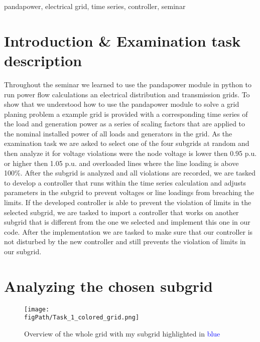 \documentclass[conference]{IEEEtran}
\newcommand{\figPath}{images}
\begin{document}
\begin{IEEEkeywords}
pandapower, electrical grid, time series, controller, seminar
\end{IEEEkeywords}

\section{Introduction \& Examination task description}
Throughout the seminar we learned to use the pandapower module in python to run power flow calculations an electrical distribution and transmission grids.\cite{pandapower.2018} To show that we understood how to use the pandapower module to solve a grid planing problem a example grid is provided with a corresponding time series of the load and generation power as a series of scaling factors that are applied to the nominal installed power of all loads and generators in the grid. As the examination task we are asked to select one of the four subgrids at random and then analyze it for voltage violations were the node voltage is lower then 0.95 p.u. or higher then 1.05 p.u. and overloaded lines where the line loading is above 100\%. After the subgrid is analyzed and all violations are recorded, we are tasked to develop a controller that runs within the time series calculation and adjusts parameters in the subgrid to prevent voltages or line loadings from breaching the limits. If the developed controller is able to prevent the violation of limits in the selected subgrid, we are tasked to import a controller that works on another subgrid that is different from the one we selected and implement this one in our code. After the implementation we are tasked to make sure that our controller is not disturbed by the new controller and still prevents the violation of limits in our subgrid. 

\section{Analyzing the chosen subgrid}

\begin{figure}[t]
	\centering
	\texttt{[image: \\figPath/Task\_1\_colored\_grid.png]}
	\caption{Overview of the whole grid with my subgrid highlighted in \textcolor{blue}{blue}}
	\label{fig:grid_overview}
\end{figure}
\end{document}
